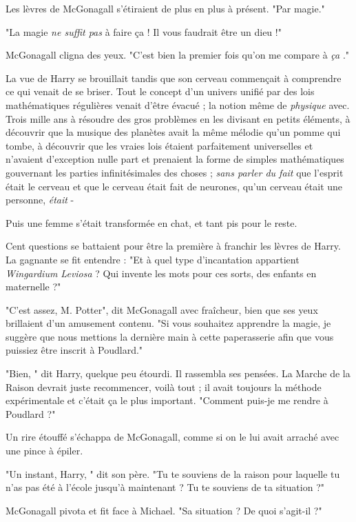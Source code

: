 Les lèvres de McGonagall s'étiraient de plus en plus à présent. "Par magie."

"La magie \emph{ne suffit pas}  à faire ça ! Il vous faudrait être un dieu !"

McGonagall cligna des yeux. "C'est bien la premier fois qu'on me compare à \emph{ça} ."

La vue de Harry se brouillait tandis que son cerveau commençait à comprendre ce qui venait de se briser. Tout le concept d'un univers unifié par des lois mathématiques régulières venait d'être évacué ; la notion même de \emph{physique}  avec. Trois mille ans à résoudre des gros problèmes en les divisant en petits éléments, à découvrir que la musique des planètes avait la même mélodie qu'un pomme qui tombe, à découvrir que les vraies lois étaient parfaitement universelles et n'avaient d'exception nulle part et prenaient la forme de simples mathématiques gouvernant les parties infinitésimales des choses ; \emph{sans parler du fait}  que l'esprit était le cerveau et que le cerveau était fait de neurones, qu'un cerveau était une personne, \emph{était}  -

Puis une femme s'était transformée en chat, et tant pis pour le reste.

Cent questions se battaient pour être la première à franchir les lèvres de Harry. La gagnante se fit entendre : "Et à quel type d'incantation appartient \emph{Wingardium Leviosa}  ? Qui invente les mots pour ces sorts, des enfants en maternelle ?"

"C'est assez, M. Potter", dit McGonagall avec fraîcheur, bien que ses yeux brillaient d'un amusement contenu. "Si vous souhaitez apprendre la magie, je suggère que nous mettions la dernière main à cette paperasserie afin que vous puissiez être inscrit à Poudlard."

"Bien, " dit Harry, quelque peu étourdi. Il rassembla ses pensées. La Marche de la Raison devrait juste recommencer, voilà tout ; il avait toujours la méthode expérimentale et c'était ça le plus important. "Comment puis-je me rendre à Poudlard ?"

Un rire étouffé s'échappa de McGonagall, comme si on le lui avait arraché avec une pince à épiler.

"Un instant, Harry, " dit son père. "Tu te souviens de la raison pour laquelle tu n'as pas été à l'école jusqu'à maintenant ? Tu te souviens de ta situation ?"

McGonagall pivota et fit face à Michael. "Sa situation ? De quoi s'agit-il ?"

